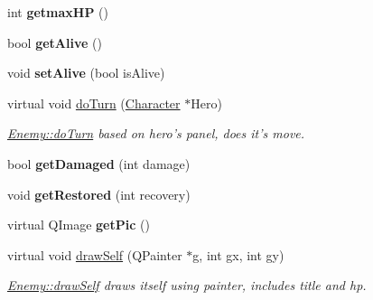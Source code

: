 \begin{DoxyCompactItemize}
\item 
\hypertarget{class_enemy_a32c6b8b1784ff8301c1cb20d969bb6bb}{int {\bfseries getmax\-H\-P} ()}\label{class_enemy_a32c6b8b1784ff8301c1cb20d969bb6bb}

\item 
\hypertarget{class_enemy_a4c6c4bfd244315ba6cfd338428f33d48}{bool {\bfseries get\-Alive} ()}\label{class_enemy_a4c6c4bfd244315ba6cfd338428f33d48}

\item 
\hypertarget{class_enemy_aa9ed76dea0526fba28e15e9667a9eb25}{void {\bfseries set\-Alive} (bool is\-Alive)}\label{class_enemy_aa9ed76dea0526fba28e15e9667a9eb25}

\item 
virtual void \hyperlink{class_enemy_a56e4b9b07e8cd2a4e5ecfa8ff5b9265a}{do\-Turn} (\hyperlink{class_character}{Character} $\ast$Hero)
\begin{DoxyCompactList}\small\item\em \hyperlink{class_enemy_a56e4b9b07e8cd2a4e5ecfa8ff5b9265a}{Enemy\-::do\-Turn} based on hero's panel, does it's move. \end{DoxyCompactList}\item 
\hypertarget{class_enemy_a577a10f1cd0eb2bdd7f600c63044b010}{bool {\bfseries get\-Damaged} (int damage)}\label{class_enemy_a577a10f1cd0eb2bdd7f600c63044b010}

\item 
\hypertarget{class_enemy_a17b20f01b5af2ca88c844fb0f072f4fc}{void {\bfseries get\-Restored} (int recovery)}\label{class_enemy_a17b20f01b5af2ca88c844fb0f072f4fc}

\item 
\hypertarget{class_enemy_a7eb85dffc1f22c21eb6ff805192f3818}{virtual Q\-Image {\bfseries get\-Pic} ()}\label{class_enemy_a7eb85dffc1f22c21eb6ff805192f3818}

\item 
virtual void \hyperlink{class_enemy_a3251244e8e7ac657687d6be5a8da71bb}{draw\-Self} (Q\-Painter $\ast$g, int gx, int gy)
\begin{DoxyCompactList}\small\item\em \hyperlink{class_enemy_a3251244e8e7ac657687d6be5a8da71bb}{Enemy\-::draw\-Self} draws itself using painter, includes title and hp. \end{DoxyCompactList}\end{DoxyCompactItemize}
